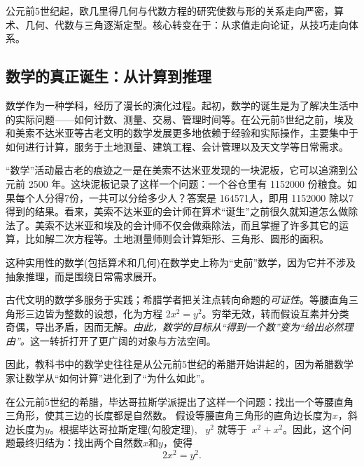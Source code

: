 公元前5世纪起，欧几里得几何与代数方程的研究使数与形的关系走向严密，算术、几何、代数与三角逐渐定型。核心转变在于：从求值走向论证，从技巧走向体系。

\subsection{数学的真正诞生：从计算到推理}
数学作为一种学科，经历了漫长的演化过程。起初，数学的诞生是为了解决生活中的实际问题——如何计数、测量、交易、管理时间等。在公元前5世纪之前，埃及和美索不达米亚等古老文明的数学发展更多地依赖于经验和实际操作，主要集中于如何进行计算，服务于土地测量、建筑工程、会计管理以及天文学等日常需求。

“数学”活动最古老的痕迹之一是在美索不达米亚发现的一块泥板，它可以追溯到公元前 2500 年。这块泥板记录了这样一个问题：一个谷仓里有 1152000 份粮食。如果每个人分得7份，一共可以分给多少人？答案是 164571人，即用 1152000 除以7得到的结果。看来，美索不达米亚的会计师在算术“诞生”之前很久就知道怎么做除法了。美索不达米亚和埃及的会计师不仅会做乘除法，而且掌握了许多其它的运算，比如解二次方程等。土地测量师则会计算矩形、三角形、圆形的面积。

这种实用性的数学(包括算术和几何)在数学史上称为“史前”数学，因为它并不涉及抽象推理，而是围绕日常需求展开。
	
	古代文明的数学多服务于实践；希腊学者把关注点转向命题的\emph{可证性}。等腰直角三角形三边皆为整数的设想，化为方程 $2x^2=y^2$。穷举无效，转而假设互素并分类奇偶，导出矛盾，因而无解。\emph{由此，数学的目标从“得到一个数”变为“给出必然理由”。}这一转折打开了更广阔的对象与方法空间。

因此，教科书中的数学史往往是从公元前5世纪的希腊开始讲起的，因为希腊数学家让数学从“如何计算”进化到了“为什么如此”。

在公元前5世纪的希腊，毕达哥拉斯学派提出了这样一个问题：找出一个等腰直角三角形，使其三边的长度都是自然数。
假设等腰直角三角形的直角边长度为$x$，斜边长度为$y$。根据毕达哥拉斯定理(勾股定理), ~$y^2$ 就等于~$x^2+x^2$。因此，这个问题最终归结为：找出两个自然数$x$和$y$，使得
\begin{equation}\label{eqn}
2x^2=y^2.
\end{equation}


